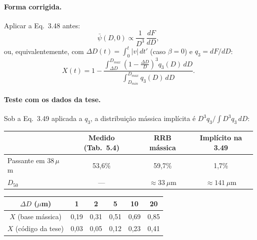 \documentclass[11pt,a4paper]{article}
\begin{document}
\paragraph{Forma corrigida.} Aplicar a Eq.~3.48 antes:
\begin{equation}
\bar\psi(D,0) \propto \frac{1}{D^{3}}\,\frac{dF}{dD},
\end{equation}
ou, equivalentemente, com $\Delta D(t) = \int_0^t |v|\,dt'$ (caso $\beta=0$) e $q_3 = dF/dD$:
\begin{equation}
X(t) = 1 - \frac{\displaystyle\int_{\Delta D}^{D_{max}}\left(1-\frac{\Delta D}{D}\right)^{3} q_3(D)\,dD}{\displaystyle\int_{D_{min}}^{D_{max}} q_3(D)\,dD}.
\end{equation}

\paragraph{Teste com os dados da tese.} Sob a Eq.~3.49 aplicada a $q_3$, a distribuição mássica implícita é $D^3 q_3/\!\int D^3 q_3\,dD$:

\begin{center}
\begin{tabular}{lccc}
\toprule
 & Medido (Tab.~5.4) & RRB mássica & Implícito na 3.49 \\
\midrule
Passante em 38\,$\mu$m & 53,6\% & 59,7\% & 1,7\% \\
$D_{50}$ & --- & $\approx 33\ \mu$m & $\approx 141\ \mu$m \\
\bottomrule
\end{tabular}
\end{center}

\begin{center}
\begin{tabular}{cccccc}
\toprule
$\Delta D$ ($\mu$m) & 1 & 2 & 5 & 10 & 20 \\
\midrule
$X$ (base mássica) & 0,19 & 0,31 & 0,51 & 0,69 & 0,85 \\
$X$ (código da tese) & 0,03 & 0,05 & 0,12 & 0,23 & 0,41 \\
\bottomrule
\end{tabular}
\end{center}
\end{document}
